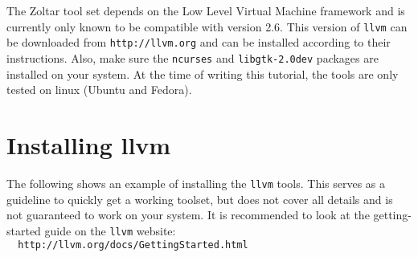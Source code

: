 
The Zoltar tool set depends on the Low Level Virtual Machine framework and
is currently only known to be compatible with version 2.6.
This version of \verb|llvm| can be downloaded from 
\verb|http://llvm.org| and can be installed according to their instructions.
Also, make sure the \verb|ncurses| and \verb|libgtk-2.0dev| packages are
installed on your system.
At the time of writing this tutorial, the tools are only tested on linux (Ubuntu and Fedora).

\section{Installing llvm}
The following shows an example of installing the \verb|llvm| tools.
This serves as a guideline to quickly get a working toolset,
but does not cover all details and is not guaranteed to work on your system.
It is recommended to look at the getting-started guide on the \verb|llvm| website:\\
\verb|  http://llvm.org/docs/GettingStarted.html|

